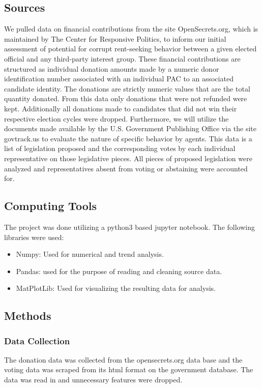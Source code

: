 \documentclass[journal]{IEEEtran}
\begin{document}
\subsection{Sources}
We pulled data on financial contributions from the site OpenSecrets.org, which is maintained by The Center for Responsive Politics, 
to inform our initial assessment of potential for corrupt rent-seeking behavior between a given elected official and any third-party 
interest group. These financial contributions are structured as individual donation amounts made by a numeric donor identification 
number associated with an individual PAC to an associated candidate identity. The donations are strictly numeric values that are the 
total quantity donated. From this data only donations that were not refunded were kept. Additionally all donations made to candidates
that did not win their respective election cycles were dropped.
\newline
  Furthermore, we will utilize the documents made available by the U.S. Government Publishing Office via the site govtrack.us to 
evaluate the nature of specific behavior by agents. This data is a list of legislation proposed and the corresponding votes by each 
individual representative on those legislative pieces. All pieces of proposed legislation were analyzed and representatives absent 
from voting or abstaining were accounted for.

\subsection{Computing Tools}
The project was done utilizing a python3 based jupyter notebook. The following libraries were used:
\begin{itemize}
 \item Numpy: Used for numerical and trend analysis.
 \item Pandas: used for the purpose of reading and cleaning source data.
 \item MatPlotLib: Used for visualizing the resulting data for analysis.
\end{itemize}

\subsection{Methods}
 \subsubsection{Data Collection} 
 The donation data was collected from the opensecrets.org data base and the voting data was scraped from its
 html format on the government database. The data was read in and unnecessary features were dropped.
\end{document}
